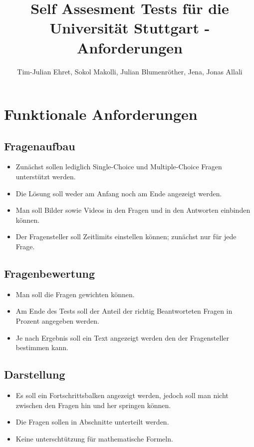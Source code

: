 \documentclass[12pt,pdftex,a4paper]{article}
\begin{document}
\title{Self Assesment Tests für die Universität Stuttgart - Anforderungen}
\author{Tim-Julian Ehret, Sokol Makolli, Julian Blumenröther, Jena, Jonas Allali}
\maketitle
\section{Funktionale Anforderungen}
\subsection{Fragenaufbau}
\begin{itemize}
 \item Zunächst sollen lediglich Single-Choice und Multiple-Choice Fragen unterstützt werden.
 \item Die Lösung soll weder am Anfang noch am Ende angezeigt werden.
 \item Man soll Bilder sowie Videos in den Fragen und in den Antworten einbinden können.
 \item Der Fragensteller soll Zeitlimits einstellen können; zunächst nur für jede Frage.
\end{itemize}
\subsection{Fragenbewertung}
\begin{itemize}
 \item Man soll die Fragen gewichten können.
 \item Am Ende des Tests soll der Anteil der richtig Beantworteten Fragen in Prozent angegeben werden.
 \item Je nach Ergebnis soll ein Text angezeigt werden den der Fragensteller bestimmen kann.
\end{itemize}
\subsection{Darstellung}
\begin{itemize}
 \item Es soll ein Fortschrittsbalken angezeigt werden, jedoch soll man nicht zwischen den Fragen hin und her springen können.
 \item Die Fragen sollen in Abschnitte unterteilt werden.
 \item Keine unterschtützung für mathematische Formeln.
\end{itemize}
\end{document}
